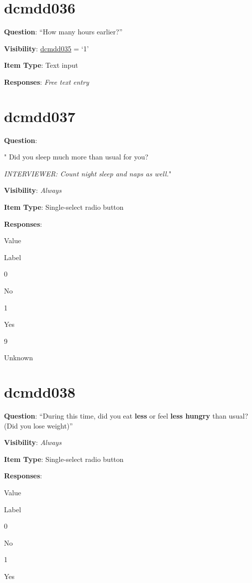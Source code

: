 \documentclass[]{book}
\begin{document}
\hypertarget{dcmdd036}{%
\section{dcmdd036}\label{dcmdd036}}

\textbf{Question}: ``How many hours earlier?''

\textbf{Visibility}: \protect\hyperlink{dcmdd035}{dcmdd035} = `1'

\textbf{Item Type}: Text input

\textbf{Responses}: \emph{Free text entry}

\hypertarget{dcmdd037}{%
\section{dcmdd037}\label{dcmdd037}}

\textbf{Question}:

"
Did you sleep much more than usual for you?

\emph{INTERVIEWER: Count night sleep and naps as well.}"

\textbf{Visibility}: \emph{Always}

\textbf{Item Type}: Single-select radio button

\textbf{Responses}:

Value

Label

0

No

1

Yes

9

Unknown

\hypertarget{dcmdd038}{%
\section{dcmdd038}\label{dcmdd038}}

\textbf{Question}: ``During this time, did you eat \textbf{less} or feel \textbf{less hungry} than usual? (Did you lose weight)''

\textbf{Visibility}: \emph{Always}

\textbf{Item Type}: Single-select radio button

\textbf{Responses}:

Value

Label

0

No

1

Yes
\end{document}
